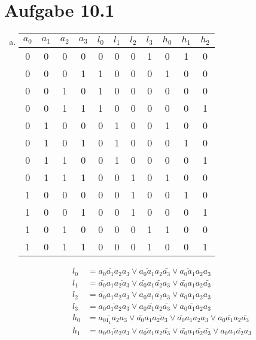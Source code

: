 \documentclass[11pt,a4paper]{article}
\author{Lukas Vormwald \and Noah Mehling \and Gregor Seewald}
\date{Übung: Dienstag 14:00}
\newcommand{\Aufgabe}[1]{\section*{Aufgabe #1}}
\begin{document}
  \maketitle

  \Aufgabe{10.1}

    \begin{enumerate}[a)]
      \item
        \begin{tabular}{|c|c|c|c||c|c|c|c|c|c|c|}
          \hline
          $a_0$&$a_1$&$a_2$&$a_3$&$l_0$&$l_1$&$l_2$&$l_3$&$h_0$&$h_1$&$h_2$\\
          \hline\hline
          0&0&0&0&0&0&0&1&0&1&0\\\hline
          0&0&0&1&1&0&0&0&1&0&0\\\hline
          0&0&1&0&1&0&0&0&0&0&0\\\hline
          0&0&1&1&1&0&0&0&0&0&1\\\hline
          0&1&0&0&0&1&0&0&1&0&0\\\hline
          0&1&0&1&0&1&0&0&0&1&0\\\hline
          0&1&1&0&0&1&0&0&0&0&1\\\hline
          0&1&1&1&0&0&1&0&1&0&0\\\hline
          1&0&0&0&0&0&1&0&0&1&0\\\hline
          1&0&0&1&0&0&1&0&0&0&1\\\hline
          1&0&1&0&0&0&0&1&1&0&0\\\hline
          1&0&1&1&0&0&0&1&0&0&1\\\hline
        \end{tabular}
        \begin{align*}
          l_0&=\overline{a_0a_1a_2}a_3\vee\overline{a_0a_1}a_2\bar{a_3}\vee\overline{a_0a_1}a_2a_3\\
          l_1&=\bar{a_0}a_1\overline{a_2a_3}\vee\bar{a_0}a_1\bar{a_2}a_3\vee\bar{a_0}a_1a_2\bar{a_3}\\
          l_2&=\bar{a_0}a_1a_2a_3\vee a_0\overline{a_1a_2a_3}\vee a_0\overline{a_1a_2}a_3\\
          l_3&=\overline{a_0a_1a_2a_3}\vee a_0\bar{a_1}a_2\bar{a_3}\vee a_0\bar{a_1}a_2a_3\\
          h_0&=\overline{a_01_1a_2}a_3\vee \bar{a_0}a_1\overline{a_2a_3}\vee\bar{a_0}a_1a_2a_3\vee a_0\bar{a_1}a_2\bar{a_3}\\
          h_1&=\overline{a_0a_1a_2a_3}\vee\overline{a_0a_1}a_2\bar{a_3}\vee\bar{a_0}a_1\bar{a_2}\bar{a_3}\vee a_0\overline{a_1a_2a_3}\\

\end{align*}
\end{enumerate}
\end{document}
